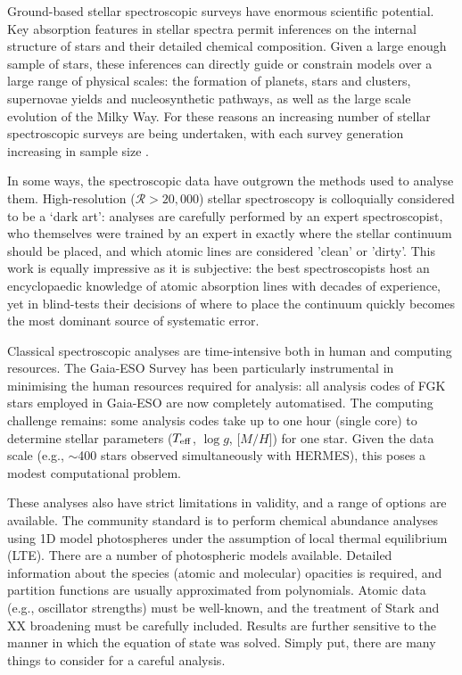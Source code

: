 \documentclass[useAMS,usenatbib]{mn2e}
\newcommand\teff{$T_{\rm eff}$}
\newcommand\logg{$\log{g}$}
\newcommand\mh{${\mathrm [M/H]}$}
\begin{document}
Ground-based stellar spectroscopic surveys have enormous scientific potential. Key absorption features in stellar spectra permit inferences on the internal structure of stars and their detailed chemical composition. Given a large enough sample of stars, these inferences can directly guide or constrain models over a large range of physical scales: the formation of planets, stars and clusters, supernovae yields and nucleosynthetic pathways, as well as the large scale evolution of the Milky Way. For these reasons an increasing number of stellar spectroscopic surveys are being undertaken, with each survey generation increasing in sample size \citep{gaia_eso; galah; lamost; apogee; 4most}.

In some ways, the spectroscopic data have outgrown the methods used to analyse them. High-resolution ($\mathcal{R} > 20,000$) stellar spectroscopy is colloquially considered to be a `dark art': analyses are carefully performed by an expert spectroscopist, who themselves were trained by an expert in exactly where the stellar continuum should be placed, and which atomic lines are considered 'clean' or 'dirty'. This work is equally impressive as it is subjective: the best spectroscopists host an encyclopaedic knowledge of atomic absorption lines with decades of experience, yet in blind-tests their decisions of where to place the continuum quickly becomes the most dominant source of systematic error.

Classical spectroscopic analyses are time-intensive both in human and computing resources. The Gaia-ESO Survey has been particularly instrumental in minimising the human resources required for analysis: all analysis codes of FGK stars employed in Gaia-ESO are now completely automatised. The computing challenge remains: some analysis codes take up to one hour (single core) to determine stellar parameters (\teff, \logg, \mh) for one star. Given the data scale (e.g., $\sim$400 stars observed simultaneously with HERMES), this poses a modest computational problem.

These analyses also have strict limitations in validity, and a range of options are available. The community standard is to perform chemical abundance analyses using 1D model photospheres under the assumption of local thermal equilibrium (LTE). There are a number of photospheric models available. Detailed information about the species (atomic and molecular) opacities is required, and partition functions are usually approximated from polynomials. Atomic data (e.g., oscillator strengths) must be well-known, and the treatment of Stark and XX broadening must be carefully included. Results are further sensitive to the manner in which the equation of state was solved. Simply put, there are many things to consider for a careful analysis.
\end{document}
